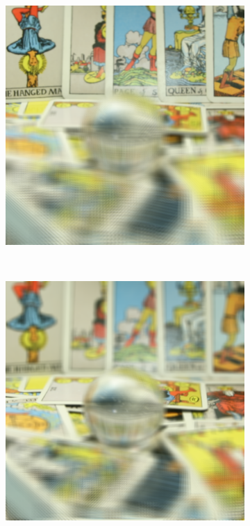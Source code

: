 \documentclass[11pt,a4paper,titlepage]{article}
\begin{document}
\begin{figure}
	\centering
	\begin{subfigure}[t]{0.19\textwidth}
		\includegraphics[width=\textwidth]{results/tarot_back_projection/sensorPlaneZ=-0.5/Back_Projection_layer_1.png} 
	\end{subfigure}%
	~
	\begin{subfigure}[t]{0.19\textwidth}
		\includegraphics[width=\textwidth]{results/tarot_back_projection/sensorPlaneZ=-0.5/Back_Projection_layer_2.png} 

\end{subfigure}
\end{figure}
\end{document}
